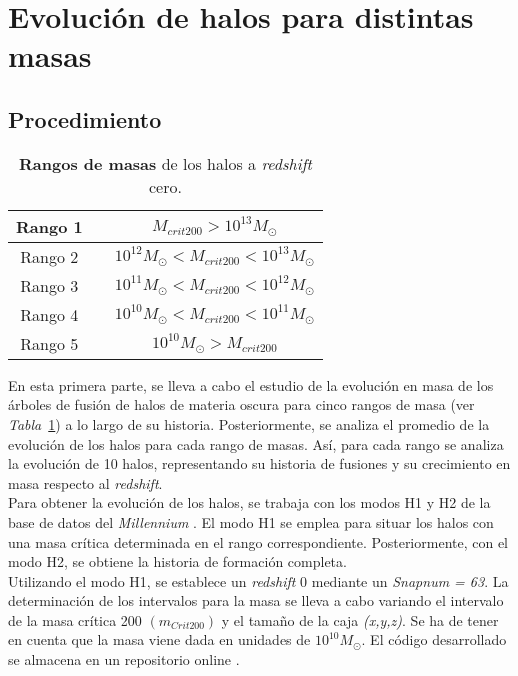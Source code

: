 \section{Evolución de halos para distintas masas} 
\label{sec:2} %

\subsection{Procedimiento}
\label{subsec:2_A}

\begin{table}[H]
\begin{center}
\begin{tabular}{ccc}
\toprule
\cellcolor[gray]{0.9}Rango 1 & & $M_{crit200}>10^{13}M_\odot$ \\
\midrule
\cellcolor[gray]{0.9}Rango 2 & & $10^{12}M_\odot<M_{crit200}<10^{13}M_\odot$ \\
\midrule
\cellcolor[gray]{0.9}Rango 3 & & $10^{11}M_\odot<M_{crit200}<10^{12}M_\odot$ \\
\midrule
\cellcolor[gray]{0.9}Rango 4 & & $10^{10}M_\odot<M_{crit200}<10^{11}M_\odot$ \\
\midrule
\cellcolor[gray]{0.9}Rango 5 & & $10^{10}M_\odot>M_{crit200}$ \\
\bottomrule
\end{tabular}
\end{center}
\caption{\textbf{Rangos de masas} de los halos a \textit{redshift} cero.}
\label{tab:tabla2}
\end{table}

En esta primera parte, se lleva a cabo el estudio de la evolución en masa de los árboles de fusión de halos de materia oscura para cinco rangos de masa (ver \textit{Tabla}~\ref{tab:tabla2}) a lo largo de su historia. Posteriormente, se analiza el promedio de la evolución de los halos para cada rango de masas. Así, para cada rango se analiza la evolución de 10 halos, representando su historia de fusiones y su crecimiento en masa respecto al \textit{redshift}.   \\

Para obtener la evolución de los halos, se trabaja con los modos H1 y H2 de la base de datos del \textit{Millennium} \cite{6}. El modo H1 se emplea para situar los halos con una masa crítica determinada en el rango correspondiente. Posteriormente, con el modo H2, se obtiene la historia de formación completa. \\

Utilizando el modo H1, se establece un \textit{redshift} 0 mediante un \textit{Snapnum = 63}. La determinación de los intervalos para la masa se lleva a cabo variando el intervalo de la masa crítica 200 $(m_{Crit200})$ y el tamaño de la caja \textit{(x,y,z)}. Se ha de tener en cuenta que la masa viene dada en unidades de $10^{10}M_\odot$. El código desarrollado se almacena en un repositorio online \cite{9}. \\

